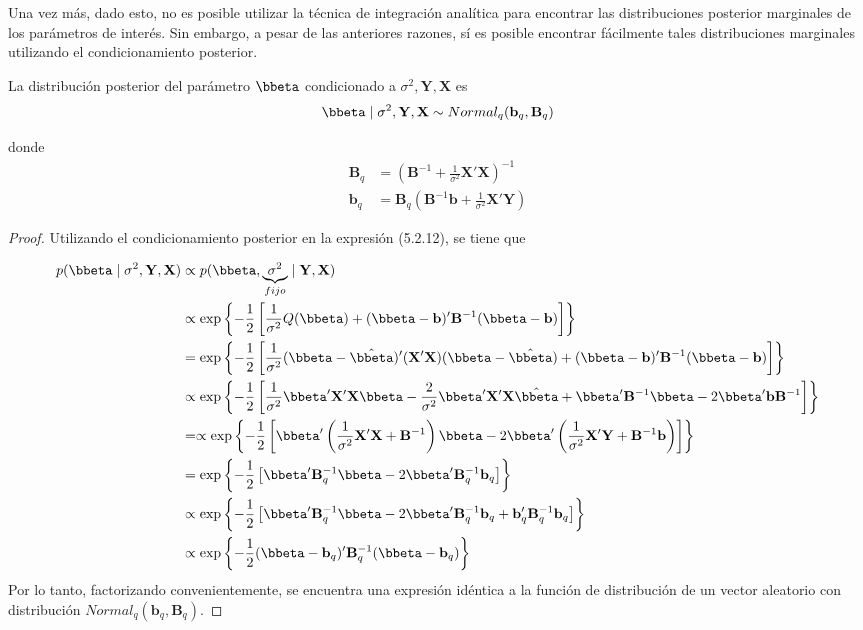 Una vez más, dado esto, no es posible utilizar la técnica de integración analítica para encontrar las distribuciones posterior marginales de los parámetros de interés. Sin embargo, a pesar de las anteriores razones, sí es posible encontrar fácilmente tales distribuciones marginales utilizando el condicionamiento posterior.

\begin{Res}
La distribución posterior del parámetro $\bbeta$ condicionado a $\sigma^2,\mathbf{Y},\mathbf{X}$ es
\begin{equation*}
\bbeta \mid \sigma^2,\mathbf{Y},\mathbf{X} \sim Normal_q(\mathbf{b}_q,\mathbf{B}_q)
\end{equation*}

donde
\begin{align*}
\mathbf{B}_q &= \left(\mathbf{B}^{-1}+\frac{1}{\sigma^2}\mathbf{X}'\mathbf{X}\right)^{-1}\\
\mathbf{b}_q &=\mathbf{B}_q\left(\mathbf{B}^{-1}\mathbf{b}+\frac{1}{\sigma^2}\mathbf{X}'\mathbf{Y}\right)
\end{align*}
\end{Res}

\begin{proof}
Utilizando el condicionamiento posterior en la expresión (5.2.12), se tiene que

\begin{align*}
p(\bbeta \mid \sigma^2,\mathbf{Y},\mathbf{X})&\propto
p(\bbeta,\underbrace{\sigma^2}_{fijo} \mid \mathbf{Y},\mathbf{X})\\
&\propto \exp\left\{-\frac{1}{2}
\left[\frac{1}{\sigma^2}Q(\bbeta)+(\bbeta-\mathbf{b})'\mathbf{B}^{-1}(\bbeta-\mathbf{b})\right]\right\}\\
&= \exp\left\{-\frac{1}{2}
\left[\frac{1}{\sigma^2}(\bbeta-\hat{\bbeta})'(\mathbf{X}'\mathbf{X})(\bbeta-\hat{\bbeta})
+(\bbeta-\mathbf{b})'\mathbf{B}^{-1}(\bbeta-\mathbf{b})\right]\right\}\\
&\propto \exp\left\{-\frac{1}{2}
\left[\frac{1}{\sigma^2}\bbeta'\mathbf{X}'\mathbf{X}\bbeta-
\frac{2}{\sigma^2}\bbeta'\mathbf{X}'\mathbf{X}\hat{\bbeta}
+\bbeta'\mathbf{B}^{-1}\bbeta-2\bbeta'\mathbf{b}\mathbf{B}^{-1}\right]\right\}\\
&=\propto \exp\left\{-\frac{1}{2}
\left[\bbeta'\left( \frac{1}{\sigma^2}\mathbf{X}'\mathbf{X}+\mathbf{B}^{-1}\right)\bbeta
-2\bbeta'\left(\frac{1}{\sigma^2}\mathbf{X}'\mathbf{Y}+\mathbf{B}^{-1}\mathbf{b}\right)\right]\right\}\\
&= \exp\left\{-\frac{1}{2}
\left[\bbeta'\mathbf{B}^{-1}_q\bbeta-2\bbeta'\mathbf{B}^{-1}_q\mathbf{b}_q\right]\right\}\\
&\propto \exp\left\{-\frac{1}{2}
\left[\bbeta'\mathbf{B}^{-1}_q\bbeta-2\bbeta'\mathbf{B}^{-1}_q\mathbf{b}_q
+\mathbf{b}_q'\mathbf{B}^{-1}_q\mathbf{b}_q\right]\right\}\\
&\propto \exp\left\{-\frac{1}{2}
(\bbeta-\mathbf{b}_q)'\mathbf{B}^{-1}_q(\bbeta-\mathbf{b}_q)\right\}
\end{align*}
Por lo tanto, factorizando convenientemente, se encuentra una expresión idéntica a la función de distribución de un vector aleatorio con distribución $Normal_q(\mathbf{b}_q,\mathbf{B}_q)$.
\end{proof}

